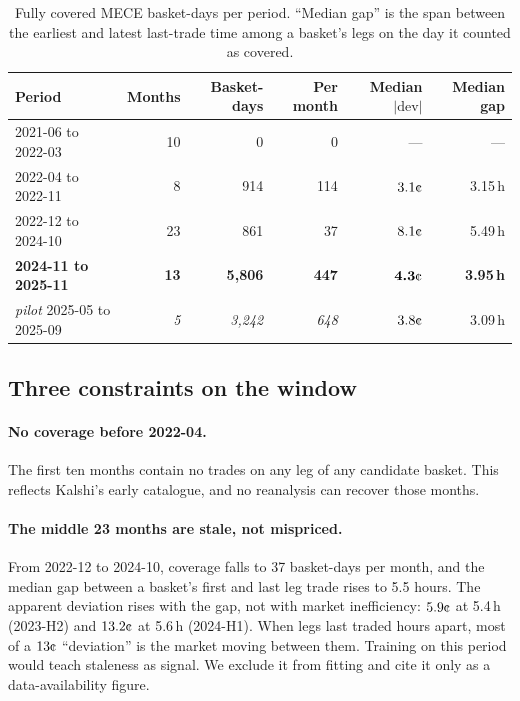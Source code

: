 \documentclass[11pt,a4paper]{article}
\newcommand{\cent}{\text{\textcent}}
\begin{document}
\begin{table}[h]
\centering\small
\caption{Fully covered MECE basket-days per period. ``Median gap'' is the span
between the earliest and latest last-trade time among a basket's legs on the day
it counted as covered.}
\label{tab:avail}
\begin{tabular}{lrrrrr}
\toprule
Period & Months & Basket-days & Per month & Median $|\mathrm{dev}|$ & Median gap \\
\midrule
2021-06 to 2022-03 & 10 & 0 & 0 & --- & --- \\
2022-04 to 2022-11 & 8 & 914 & 114 & $3.1\cent$ & 3.15\,h \\
2022-12 to 2024-10 & 23 & 861 & 37 & $8.1\cent$ & 5.49\,h \\
\textbf{2024-11 to 2025-11} & \textbf{13} & \textbf{5{,}806} & \textbf{447} & $\bm{4.3\cent}$ & \textbf{3.95\,h} \\
\midrule
\emph{pilot} 2025-05 to 2025-09 & \emph{5} & \emph{3{,}242} & \emph{648} & $3.8\cent$ & 3.09\,h \\
\bottomrule
\end{tabular}
\end{table}

\subsection{Three constraints on the window}
\paragraph{No coverage before 2022-04.} The first ten months contain no trades on
any leg of any candidate basket. This reflects Kalshi's early catalogue, and no
reanalysis can recover those months.

\paragraph{The middle 23 months are stale, not mispriced.}\label{sec:stale} From
2022-12 to 2024-10, coverage falls to 37 basket-days per month, and the median gap
between a basket's first and last leg trade rises to 5.5 hours. The apparent
deviation rises with the gap, not with market inefficiency: $5.9\cent$ at 5.4\,h
(2023-H2) and $13.2\cent$ at 5.6\,h (2024-H1). When legs last traded hours apart,
most of a $13\cent$ ``deviation'' is the market moving between them. Training on
this period would teach staleness as signal. We exclude it from fitting and cite
it only as a data-availability figure.
\end{document}
